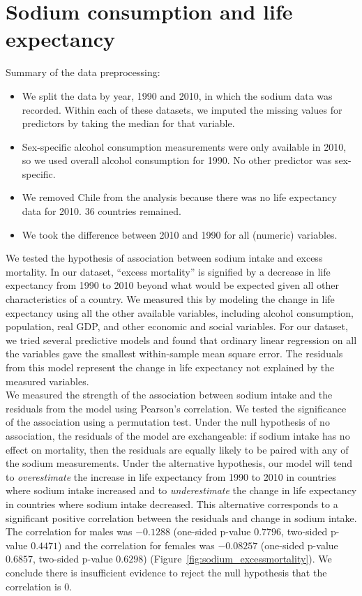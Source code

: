 \documentclass{article}
\begin{document}
\let\thefootnote\relax{}

\section{Sodium consumption and life expectancy}

Summary of the data preprocessing:
\begin{itemize}
\item We split the data by year, 1990 and 2010, in which the sodium data was recorded. Within each of these datasets, we imputed the missing values for predictors by taking the median for that variable.
\item Sex-specific alcohol consumption measurements were only available in 2010, so we used overall alcohol consumption for 1990. No other predictor was sex-specific. 
\item We removed Chile from the analysis because there was no life expectancy data for 2010. 36 countries remained.
\item	We took the difference between 2010 and 1990 for all (numeric) variables.
\end{itemize}

We tested the hypothesis of association between sodium intake and excess mortality.  In our dataset, ``excess mortality'' is signified by a decrease in life expectancy from 1990 to 2010 beyond what would be expected given all other characteristics of a country.  We measured this by modeling the change in life expectancy using all the other available variables, including alcohol consumption, population, real GDP, and other economic and social variables.  For our dataset, we tried several predictive models and found that ordinary linear regression on all the variables gave the smallest within-sample mean square error.  The residuals from this model represent the change in life expectancy not explained by the measured variables. \\

We measured the strength of the association between sodium intake and the residuals from the model using Pearson's correlation. We tested the significance of the association using a permutation test.  Under the null hypothesis of no association, the residuals of the model are exchangeable: if sodium intake has no effect on mortality, then the residuals are equally likely to be paired with any of the sodium measurements.  Under the alternative hypothesis, our model will tend to \textit{overestimate} the increase in life expectancy from 1990 to 2010 in countries where sodium intake increased and to \textit{underestimate} the change in life expectancy in countries where sodium intake decreased. This alternative corresponds to a significant positive correlation between the residuals and change in sodium intake.  The correlation for males was $-0.1288$ (one-sided p-value $0.7796$, two-sided p-value $0.4471$) and the correlation for females was $-0.08257$ (one-sided p-value $0.6857$, two-sided p-value $0.6298$) (Figure~\ref{fig:sodium_excessmortality}). We conclude there is insufficient evidence to reject the null hypothesis that the correlation is $0$. \\
\end{document}
